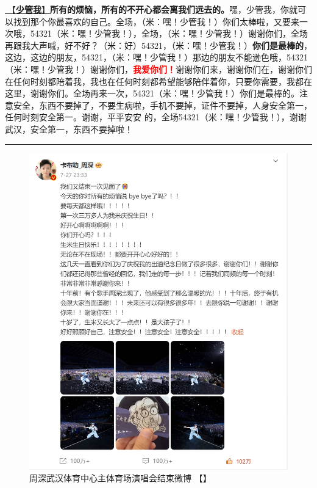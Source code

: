 \documentclass[]{ctexbook}
\begin{document}
\hyperref[watch-ur-manners]{🎵【\textbf{少管我}】}\textbf{所有的烦恼，所有的不开心都会离我们远去的。}嘿，少管我，你就可以找到那个你最喜欢的自己。全场，（米：嘿！少管我！）你们太棒啦，又要来一次哦，54321（米：嘿！少管我！），全场，（米：嘿！少管我！）谢谢你们，全场再跟我大声喊，好不好？（米：好）54321，（米：嘿！少管我！）\textbf{你们是最棒的}，这边，这边的朋友，54321，（米：嘿！少管我！）那边的朋友不能逊色哦，54321（米：嘿！少管我！）谢谢你们，\textbf{\textcolor{red}{我爱你们！}}谢谢你们来，谢谢你们在，谢谢你们在任何时刻都陪着我，我也在任何时刻都希望能够陪伴着你，只要你需要，我都在这里，谢谢你们。全场再来一次，54321（米：嘿！少管我！）你们是最棒的。注意安全，东西不要掉了，不要生病啦，手机不要掉，证件不要掉，人身安全第一，任何时刻安全第一。谢谢，平平安安 的，全场54321（米：嘿！少管我！），谢谢武汉，安全第一，东西不要掉啦！

\begin{center}\rule{0.5\linewidth}{0.5pt}\end{center}

\begin{figure}
\centering
\includegraphics{img/weibo/wuhan-20240727.png}
\caption{\label{fig:unnamed-chunk-69}周深武汉体育中心主体育场演唱会结束微博 【\citet{weibo-charlie}】}
\end{figure}
\end{document}
